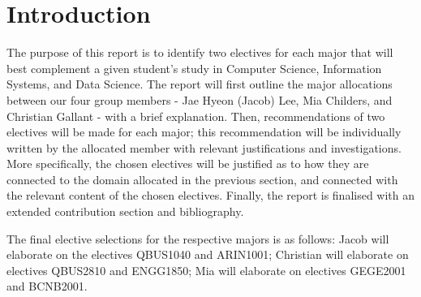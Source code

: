 \section{\textbf{Introduction}}

The purpose of this report is to identify two electives for each major that will best complement a given student’s study in Computer Science, Information Systems, and Data Science. The report will first outline the major allocations between our four group members - Jae Hyeon (Jacob) Lee, Mia Childers, and Christian Gallant - with a brief explanation. Then, recommendations of two electives will be made for each major; this recommendation will be individually written by the allocated member with relevant justifications and investigations. More specifically, the chosen electives will be justified as to how they are connected to the domain allocated in the previous section, and connected with the relevant content of the chosen electives. Finally, the report is finalised with an extended contribution section and bibliography. 

The final elective selections for the respective majors is as follows: Jacob will elaborate on the electives QBUS1040 and ARIN1001; Christian will elaborate on electives QBUS2810 and ENGG1850; Mia will elaborate on electives GEGE2001 and BCNB2001. 